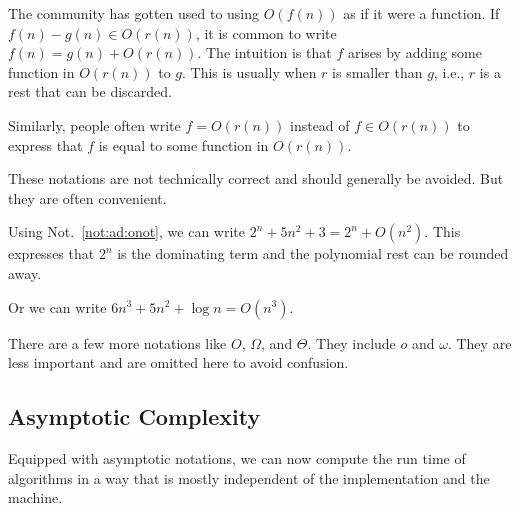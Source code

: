 
\begin{notation}\label{not:ad:onot}
The community has gotten used to using $O(f(n))$ as if it were a function.
If $f(n)-g(n)\in O(r(n))$, it is common to write $f(n)=g(n)+O(r(n))$.
The intuition is that $f$ arises by adding some function in $O(r(n))$ to $g$.
This is usually when $r$ is smaller than $g$, i.e., $r$ is a rest that can be discarded.

Similarly, people often write $f=O(r(n))$ instead of $f\in O(r(n))$ to express that $f$ is equal to some function in $O(r(n))$.
\medskip

These notations are not technically correct and should generally be avoided.
But they are often convenient.
\end{notation}

\begin{example}\label{ex:ad:onot2}
Using Not.~\ref{not:ad:onot}, we can write
 $2^n+5n^2+3=2^n+O(n^2)$.
This expresses that $2^n$ is the dominating term and the polynomial rest can be rounded away.

Or we can write $6n^3+5n^2+\log n=O(n^3)$.
\end{example}

\begin{remark}
There are a few more notations like $O$, $\Omega$, and $\Theta$.
They include $o$ and $\omega$.
They are less important and are omitted here to avoid confusion.
\end{remark}

\subsection{Asymptotic Complexity}\label{sec:ad:asympana}

Equipped with asymptotic notations, we can now compute the run time of algorithms in a way that is mostly independent of the implementation and the machine.

